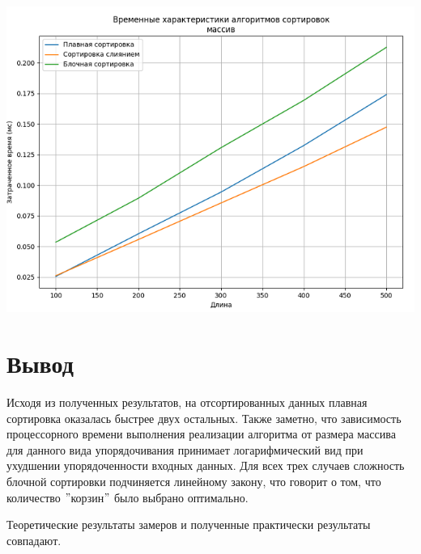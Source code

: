 \begin{center}
\includegraphics[trim=0 0 0 -5cm bb=0 0 484 650]{src/worst}
	\label{img:graph_sorted_back}
\end{center}
\newpage


\section*{Вывод}
Исходя из полученных результатов, на отсортированных данных плавная сортировка оказалась быстрее двух остальных. Также заметно, что зависимость процессорного времени выполнения реализации алгоритма от размера массива для данного вида упорядочивания принимает логарифмический вид при ухудшении упорядоченности входных данных. Для всех трех случаев сложность блочной сортировки подчиняется линейному закону, что говорит о том, что количество $"$корзин$"$ было выбрано оптимально.

Теоретические результаты замеров и полученные практически результаты совпадают.